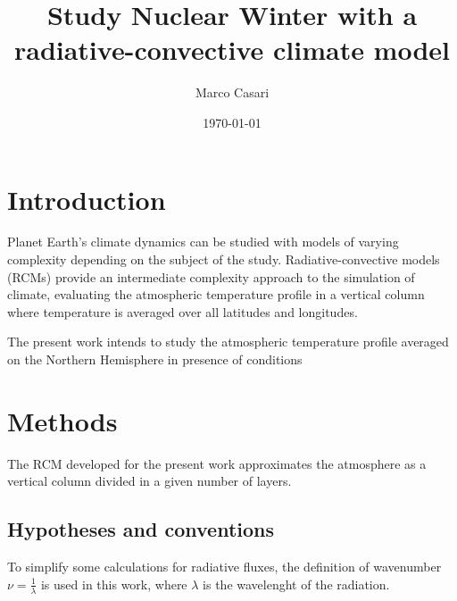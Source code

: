 \documentclass[a4paper,10pt,final,twocolumn]{article}
\begin{document}
\title{Study Nuclear Winter with a radiative-convective climate model} %
\author{Marco Casari}
\date{\today}
\maketitle

\begin{abstract}
\end{abstract}


\section{Introduction}
Planet Earth's climate dynamics can be studied with models of varying complexity depending on the subject of the study. Radiative-convective models (RCMs) provide an intermediate complexity approach to the simulation of climate, evaluating the atmospheric temperature profile in a vertical column where temperature is averaged over all latitudes and longitudes.

The present work intends to study the atmospheric temperature profile averaged on the Northern Hemisphere in presence of conditions 


\section{Methods}
The RCM developed for the present work approximates the atmosphere as a vertical column divided in a given number of layers.

\subsection{Hypotheses and conventions}
\label{sec:Hypotheses and conventions}
To simplify some calculations for radiative fluxes, the definition of wavenumber $\nu = \frac{1}{\lambda}$ is used in this work, where $\lambda$ is the wavelenght of the radiation.
\end{document}
